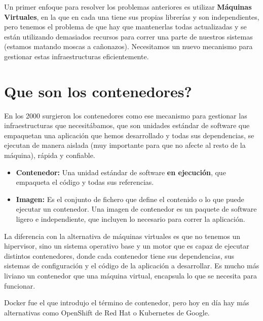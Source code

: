 \documentclass[12pt, twoside, openright]{report} %
\begin{document}
Un primer enfoque para resolver los problemas anteriores es utilizar \textbf{Máquinas Virtuales}, en la que en cada una tiene sus propias librerías y son independientes, pero tenemos el problema de que hay que mantenerlas todas actualizadas y se están utilizando demasiados recursos para correr una parte de nuestros sistemas (estamos matando moscas a cañonazos).
Necesitamos un nuevo mecanismo para gestionar estas infraestructuras eficientemente.

\section{Que son los contenedores?}
En los 2000 surgieron los contenedores como ese mecanismo para gestionar las infraestructuras que necesitábamos, que son unidades estándar de software que empaquetan una aplicación que hemos desarrollado y todas sus dependencias, se ejecutan de manera aislada (muy importante para que no afecte al resto de la máquina), rápida y confiable.

\begin{itemize}
	\item \textbf{Contenedor:} Una unidad estándar de software \textbf{en ejecución}, que empaqueta el código y todas sus referencias.
	\item \textbf{Imagen:} Es el conjunto de fichero que define el contenido o lo que puede ejecutar un contenedor.
	      Una imagen de contenedor es un paquete de software ligero e independiente, que incluyen lo necesario para correr la aplicación.
\end{itemize}
\pagebreak

La diferencia con la alternativa de máquinas virtuales es que no tenemos un hipervisor, sino un sistema operativo base y un motor que es capaz de ejecutar distintos contenedores, donde cada contenedor tiene sus dependencias, sus sistemas de configuración y el código de la aplicación a desarrollar. Es mucho más liviano un contenedor que una máquina virtual, encapsula lo que se necesita para funcionar.

Docker fue el que introdujo el término de contenedor, pero hoy en día hay más alternativas como OpenShift de Red Hat o Kubernetes de Google.
\end{document}
